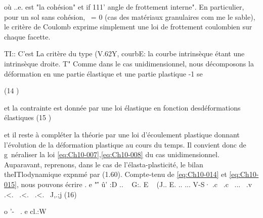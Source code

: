 où ..e. est "la cohésion" et if 111' angle de frottement interne". En particu­lier, pour un sol sans cohésion, ~= 0 (cas des matériaux granulaires com­
me le sable), le critère de Coulomb exprime simplement une loi de frotte­ment coulombien sur chaque facette. 

TI:: C'est La critère du type (V.62Y, 
courbE: 
la courbe intrinsèque étant une 
intrinsèque 
droite. 
T" 
Comme dans le cas unidimensionnel, nous décomposons la déformation 
en une partie élastique et une partie plastique 
-1 se ­

(14 ) 

et la contrainte est donnée par une loi élastique en fonction desdéforma­tions élastiques 
(15 ) 

et il reste à compléter la théorie par une loi d'écoulement plastique don­nant l'évolution de la déformation plastique au cours du temps. Il convient donc de g~néraliser la loi \eqref{eq:Ch10-007},\eqref{eq:Ch10-008} du cas unidimensionnel. Auparavant, re­prenons, dans le cas de l'élasta-plasticité, le bilan theITlodynamique expn­mé par (1.60). Compte-tenu de \eqref{eq:Ch10-014} et \eqref{eq:Ch10-015}, nous pouvons écrire 
. e "'\'­
û' :D .. ~ G:. E ~ (J.. E. .. ... V-S· 
.c~ .c~ ...~ .v~ .<.~ .<.~ .<.~ J,.;j 
(16) 


o '-~ . e cl.:W 

